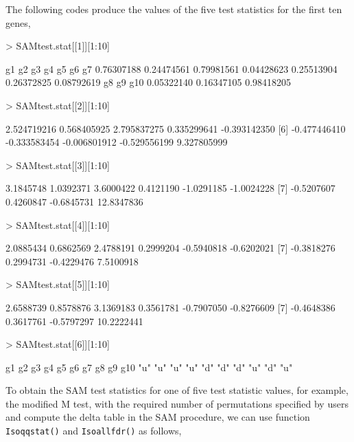 \documentclass[10pt]{mybook4}
\begin{document}
The following codes produce the values of the five test statistics for the first ten genes,

\begin{Schunk}
\begin{Sinput}
> SAMtest.stat[[1]][1:10]
\end{Sinput}
\begin{Soutput}
        g1         g2         g3         g4         g5         g6         g7 
0.76307188 0.24474561 0.79981561 0.04428623 0.25513904 0.26372825 0.08792619 
        g8         g9        g10 
0.05322140 0.16347105 0.98418205 
\end{Soutput}
\begin{Sinput}
> SAMtest.stat[[2]][1:10]
\end{Sinput}
\begin{Soutput}
 [1]  2.524719216  0.568405925  2.795837275  0.335299641 -0.393142350
 [6] -0.477446410 -0.333583454 -0.006801912 -0.529556199  9.327805999
\end{Soutput}
\begin{Sinput}
> SAMtest.stat[[3]][1:10]
\end{Sinput}
\begin{Soutput}
 [1]  3.1845748  1.0392371  3.6000422  0.4121190 -1.0291185 -1.0024228
 [7] -0.5207607  0.4260847 -0.6845731 12.8347836
\end{Soutput}
\begin{Sinput}
> SAMtest.stat[[4]][1:10]
\end{Sinput}
\begin{Soutput}
 [1]  2.0885434  0.6862569  2.4788191  0.2999204 -0.5940818 -0.6202021
 [7] -0.3818276  0.2994731 -0.4229476  7.5100918
\end{Soutput}
\begin{Sinput}
> SAMtest.stat[[5]][1:10]
\end{Sinput}
\begin{Soutput}
 [1]  2.6588739  0.8578876  3.1369183  0.3561781 -0.7907050 -0.8276609
 [7] -0.4648386  0.3617761 -0.5797297 10.2222441
\end{Soutput}
\begin{Sinput}
> SAMtest.stat[[6]][1:10]
\end{Sinput}
\begin{Soutput}
 g1  g2  g3  g4  g5  g6  g7  g8  g9 g10 
"u" "u" "u" "u" "d" "d" "d" "u" "d" "u" 
\end{Soutput}
\end{Schunk}


To obtain the SAM test statistics for one of five test statistic values, for example, the modified M test,
with the required number of permutations specified by users and compute the
delta table in the SAM procedure, we can use function \texttt{Isoqqstat()} and \texttt{Isoallfdr()} as follows,
\end{document}
